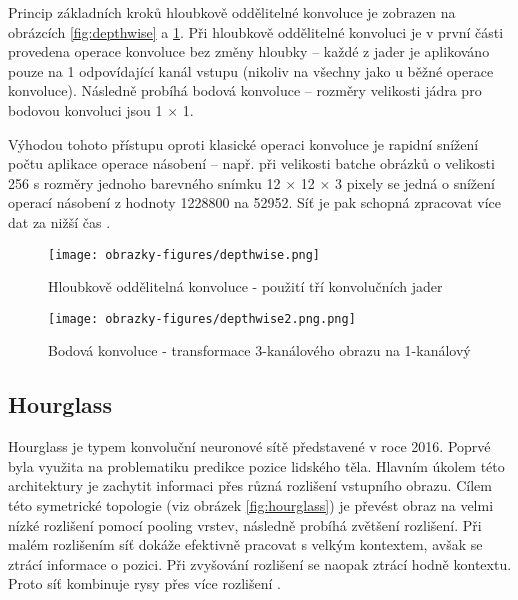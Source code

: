 Princip základních kroků hloubkově oddělitelné konvoluce je zobrazen na obrázcích \ref{fig:depthwise} a \ref{fig:depthwise2}. Při hloubkově oddělitelné konvoluci je v první části provedena operace konvoluce bez změny hloubky -- každé z jader je aplikováno pouze na 1 odpovídající kanál vstupu (nikoliv na všechny jako u běžné operace konvoluce). Následně probíhá bodová konvoluce -- rozměry velikosti jádra pro bodovou konvoluci jsou 1 $\times$ 1.

Výhodou tohoto přístupu oproti klasické operaci konvoluce je rapidní snížení počtu aplikace operace násobení -- např. při velikosti batche obrázků o velikosti 256 s rozměry jednoho barevného snímku 12 $\times$ 12 $\times$ 3 pixely se jedná o snížení operací násobení z hodnoty 1228800 na 52952. Síť je pak schopná zpracovat více dat za nižší čas \cite{SeparableConvolutions}. 

\begin{figure}[!htbp]
  \begin{minipage}[b]{0.5\linewidth}
    \centering
    \texttt{[image: obrazky-figures/depthwise.png]}
    \caption{Hloubkově oddělitelná konvoluce - použití tří konvolučních jader \cite{SeparableConvolutions}}
    \label{fig:depthwise}
  \end{minipage}
  \hspace{0.5cm}
  \begin{minipage}[b]{0.5\linewidth}
    \centering
    \texttt{[image: obrazky-figures/depthwise2.png.png]}
    \caption{Bodová konvoluce - transformace 3-kanálového obrazu na 1-kanálový \cite{SeparableConvolutions}}
    \label{fig:depthwise2}
  \end{minipage}
\end{figure}

\subsection{Hourglass}
Hourglass je typem konvoluční neuronové sítě představené v roce 2016. Poprvé byla využita na problematiku predikce pozice lidského těla. Hlavním úkolem této architektury je zachytit informaci přes různá rozlišení vstupního obrazu. Cílem této symetrické topologie (viz obrázek \ref{fig:hourglass}) je převést obraz na velmi nízké rozlišení pomocí pooling vrstev, následně probíhá zvětšení rozlišení. Při malém rozlišením síť dokáže efektivně pracovat s velkým kontextem, avšak se ztrácí informace o pozici. Při zvyšování rozlišení se naopak ztrácí hodně kontextu. Proto síť kombinuje rysy přes více rozlišení \cite{Hourglass}.

